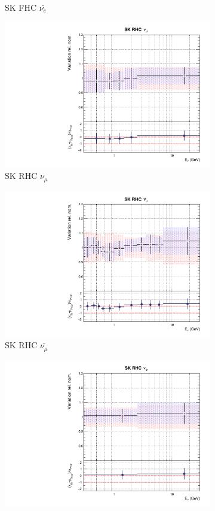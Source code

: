\begin{figure}[t]
\begin{subfigure}{0.45\textwidth}
  \caption{SK FHC $\bar{\nu_e}$}
\end{subfigure}
\begin{subfigure}{0.45\textwidth}
  \centering
  \includegraphics[width=0.75\linewidth]{figs/rhcmpdat248flux_12}
  \caption{SK RHC $\nu_{\mu}$}
\end{subfigure}
\begin{subfigure}{0.45\textwidth}
  \centering
  \includegraphics[width=0.75\linewidth]{figs/rhcmpdat248flux_13}
  \caption{SK RHC $\bar{\nu_{\mu}}$}
\end{subfigure}
\begin{subfigure}{0.45\textwidth}
  \centering
  \includegraphics[width=0.75\linewidth]{figs/rhcmpdat248flux_14}

\end{subfigure}
\end{figure}
